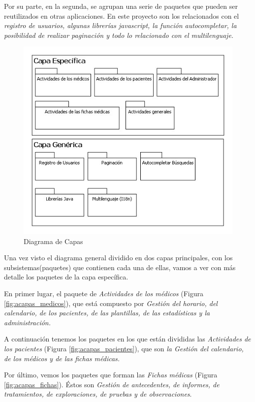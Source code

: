 \documentclass[a4paper,oneside,11pt]{book}
\begin{document}
		Por su parte, en la segunda, se agrupan una serie de paquetes que pueden ser reutilizados en otras aplicaciones. En este proyecto son los relacionados con el \textit{registro de usuarios, algunas librerías javascript, la función autocompletar, la posibilidad de realizar paginación y todo lo relacionado con el multilenguaje.}
		
		\begin{figure}[H]
		  \centering
		    \includegraphics[width=13cm]{img/jpg/acapas/capas.jpg}
		  \caption{Diagrama de Capas}
		  \label{fig:acapas}
		\end{figure}
		
		Una vez visto el diagrama general dividido en dos capas principales, con los subsistemas(paquetes) que contienen cada una de ellas, vamos a ver con más detalle los paquetes de la capa específica.
		
		En primer lugar, el paquete de \textit{Actividades de los médicos} (Figura \ref{fig:acapas_medicos}), que está compuesto por \textit{Gestión del horario, del calendario, de los pacientes, de las plantillas, de las estadísticas y la administración.}
		
		A continuación tenemos los paquetes en los que están divididas las \textit{Actividades de los pacientes} (Figura \ref{fig:acapas_pacientes}), que son \textit{la Gestión del calendario, de los médicos y de las fichas médicas.}
		
		Por último, vemos los paquetes que forman las \textit{Fichas médicas} (Figura \ref{fig:acapas_fichas}). Éstos son \textit{Gestión de antecedentes, de informes, de tratamientos, de exploraciones, de pruebas y de observaciones}.
		
\end{document}

